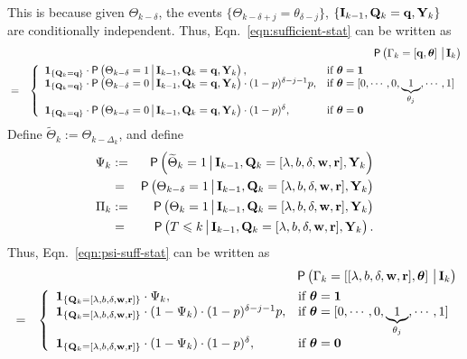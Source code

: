 \documentclass[acmtosn]{acmtrans2m}
\newcommand{\prob}[1]{\mathsf{P}\left(#1\right)}
\newcommand{\nn}{\nonumber \\}
{\theorembodyfont{\rmfamily}
\newtheorem{remarks}{Remark}[section]} \newtheorem{theorem}{Theorem}
\begin{document}
This is because given $\Theta_{k-\delta} $, the events 
$\{\Theta_{k-\delta+j} = \theta_{\delta-j} \}$, 
$\left\{{\bf I}_{k-1}, {\bf Q}_k = {\bf q}, 
{\bf Y}_k
\right\}$ are conditionally independent. 
Thus, Eqn.~\ref{eqn:sufficient-stat} can be written as
{
\begin{eqnarray}
\label{eqn:psi-suff-stat}
& &\prob{\Gamma_k = \left[{\bf q}, 
{\mbox{\boldmath$\theta$}}\right] \big\arrowvert{\bf I}_k}\nn   
& = & \left\{
\begin{array}{ll}
{\bf 1}_{\{{\bf Q}_k = {\bf q}\}} \cdot 
\prob{\Theta_{k-\delta} = 1 
\big\arrowvert {\bf I}_{k-1}, {\bf Q}_k = {\bf q}, {\bf Y}_k
}, & \text{if} \  {\mbox{\boldmath$\theta$}} = {\bf 1}\\
{\bf 1}_{\{{\bf Q}_k = {\bf q} \}} \cdot 
\prob{\Theta_{k-\delta} = 0 
\big\arrowvert {\bf I}_{k-1}, {\bf Q}_k = {\bf q}, {\bf Y}_k
} \cdot (1-p)^{\delta-j-1} p, & \text{if} \  {\mbox{\boldmath$\theta$}} =
[0,\cdots,0,\underbrace{1}_{\theta_{j}}, \cdots,
1]\\
{\bf 1}_{\{{\bf Q}_k = {\bf q} \}} \cdot 
\prob{\Theta_{k-\delta} = 0 
\big\arrowvert {\bf I}_{k-1}, {\bf Q}_k = {\bf q}, {\bf Y}_k
} \cdot (1-p)^{\delta}, & \text{if} \  {\mbox{\boldmath$\theta$}}
= {\bf 0}
\end{array}
\right.\nn
\end{eqnarray}
}
Define
$\widetilde{\Theta}_k := \Theta_{k-\Delta_k}$,
and define
\begin{eqnarray}
\label{eqn:pi}
\Psi_k & := & \prob{ {\widetilde{\Theta}_k} = 1 \big\arrowvert {\bf
I}_{k-1}, {\bf Q}_k = [\lambda,b,\delta,{\bf w},{\bf r}],{\bf Y}_k 
}\nn 
&= & \prob{ \Theta_{k - \delta}=1 \big\arrowvert {\bf I}_{k-1}, {\bf
Q}_k = [\lambda,b,\delta,{\bf w},{\bf r}],{\bf Y}_k  }\nn 
\Pi_k  & := & \prob{ {\Theta_k} = 1 \big\arrowvert {\bf I}_{k-1}, {\bf
Q}_k = [\lambda,b,\delta,{\bf w},{\bf r}],{\bf Y}_k   } \nn
& = &
\prob{ T \leqslant k \big\arrowvert {\bf I}_{k-1}, {\bf Q}_k =
[\lambda,b,\delta,{\bf w},{\bf r}], {\bf Y}_k  }. \nn 
\end{eqnarray}
Thus, Eqn.~\ref{eqn:psi-suff-stat} can be written as 
\begin{eqnarray}
\label{eqn:1psi-suff-stat}
& &\prob{\Gamma_k = \left[[\lambda,b,\delta,{\bf w},{\bf r}] ,
{\mbox{\boldmath$\theta$}}\right] \big\arrowvert{\bf I}_k}\nn   
& = & \left\{
\begin{array}{ll}
{\bf 1}_{\{{\bf Q}_k = [\lambda,b,\delta,{\bf w},{\bf r}] \}} \cdot
\Psi_k, & \text{if} \  {\mbox{\boldmath$\theta$}} = {\bf 1}\\
{\bf 1}_{\{{\bf Q}_k = [\lambda,b,\delta,{\bf w},{\bf r}] \}} \cdot 
(1-\Psi_k) \cdot (1-p)^{\delta-j-1} p, & \text{if} \  {\mbox{\boldmath$\theta$}} =
[0,\cdots,0,\underbrace{1}_{\theta_{j}}, \cdots,
1]\\
{\bf 1}_{\{{\bf Q}_k = [\lambda,b,\delta,{\bf w},{\bf r}] \}} \cdot 
(1-\Psi_k) \cdot (1-p)^{\delta}, & \text{if} \  {\mbox{\boldmath$\theta$}}
= {\bf 0}
\end{array}
\right.
\end{eqnarray}
\end{document}
